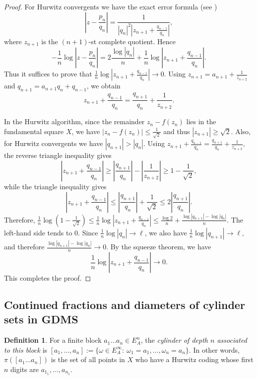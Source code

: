 \documentclass[11pt]{amsart}
\theoremstyle{plain}
\theoremstyle{definition}
\newtheorem{definition}[theorem]{Definition}
\renewcommand\~{\tilde}%
\newcommand{\om}{\ensuremath{\omega}}
\numberwithin{equation}{section}
\begin{document}
\begin{proof}
For Hurwitz convergents we have the exact error formula (see \cite[Proof of Proposition 3.3]{DaniNogueira14}) 
$$
\left|z-\frac{p_n}{q_n}\right|
=
\frac{1}{|q_n|^2\left|z_{n+1}+\frac{q_{n-1}}{q_n}\right|},
$$
where $z_{n+1}$ is the $(n+1)$-st complete quotient. 
Hence
$$
-\frac{1}{n}\log\left|z-\frac{p_n}{q_n}\right|
=
2\frac{\log|q_n|}{n}
+
\frac{1}{n}\log\left|z_{n+1}+\frac{q_{n-1}}{q_n}\right|.
$$
Thus it suffices to prove that
$
\frac{1}{n}\log\left|z_{n+1}+\frac{q_{n-1}}{q_n}\right| \to 0.
$ Using
$z_{n+1}=a_{n+1}+\frac{1}{z_{n+2}}$ and $q_{n+1}=a_{n+1}q_n+q_{n-1}$, we obtain
$$
z_{n+1}+\frac{q_{n-1}}{q_n}
=
\frac{q_{n+1}}{q_n}+\frac{1}{z_{n+2}}.
$$

In the Hurwitz algorithm, since the remainder $z_n-f(z_n)$ lies in the fundamental square $X$, we have
$|z_n-f(z_n)| \le \frac{1}{\sqrt{2}}$ and thus $|z_{n+1}| \ge \sqrt{2}$.
Also, for Hurwitz convergents we have $|q_{n+1}|>|q_n|$. 
Using
$
z_{n+1}+\frac{q_{n-1}}{q_n}
=
\frac{q_{n+1}}{q_n}+\frac{1}{z_{n+2}},
$
the reverse triangle inequality gives
$$
\left|z_{n+1}+\frac{q_{n-1}}{q_n}\right|
\ge
\left|\frac{q_{n+1}}{q_n}\right|-\left|\frac{1}{z_{n+2}}\right|
\ge
1-\frac{1}{\sqrt{2}},
$$
while the triangle inequality gives
$$
\left|z_{n+1}+\frac{q_{n-1}}{q_n}\right|
\le
\left|\frac{q_{n+1}}{q_n}\right|+\frac{1}{\sqrt{2}}
\le
2\left|\frac{q_{n+1}}{q_n}\right|.
$$
Therefore,
$
\frac{1}{n}\log\left(1-\frac{1}{\sqrt{2}}\right)
\le
\frac{1}{n}\log\left|z_{n+1}+\frac{q_{n-1}}{q_n}\right|
\le
\frac{\log 2}{n}+\frac{\log|q_{n+1}|-\log|q_n|}{n}.
$
The left-hand side tends to $0$. Since $\frac{1}{n}\log|q_n| \to \ell$,
we also have $\frac{1}{n}\log|q_{n+1}| \to \ell,$
and therefore
$
\frac{\log|q_{n+1}|-\log|q_n|}{n}\to 0.
$
By the squeeze theorem, we have
$$
\frac{1}{n}\log\left|z_{n+1}+\frac{q_{n-1}}{q_n}\right| \to 0.
$$
This completes the proof.
\end{proof}


\subsection{Continued fractions and diameters of cylinder sets in GDMS}
\begin{definition}
For a finite block $a_1\dots a_n\in E_A^n$, the {\it cylinder of depth $n$ associated to this block} is 
$
[a_1,\dots,a_n]
:=
\{\om\in E_A^{\infty}:\ \om_1=a_1,\dots,\om_n=a_n\}.
$
In other words, $\pi([a_1\dots a_n])$ is the set of all points in $X$ who have a Hurwitz coding whose first $n$ digits are $a_{1_1},\dots,a_{n_1}$.
\end{definition}
\end{document}
